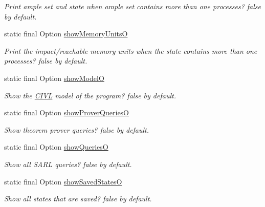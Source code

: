 \begin{DoxyCompactItemize}
\begin{DoxyCompactList}\small\item\em Print ample set and state when ample set contains more than one processes? false by default. \end{DoxyCompactList}\item 
static final Option \hyperlink{classedu_1_1udel_1_1cis_1_1vsl_1_1civl_1_1config_1_1IF_1_1CIVLConstants_a2ee171df807b757e1939921c136ed0de}{show\+Memory\+Units\+O}
\begin{DoxyCompactList}\small\item\em Print the impact/reachable memory units when the state contains more than one processes? false by default. \end{DoxyCompactList}\item 
static final Option \hyperlink{classedu_1_1udel_1_1cis_1_1vsl_1_1civl_1_1config_1_1IF_1_1CIVLConstants_adead4ea0b8731d999ff5cc756eb225f1}{show\+Model\+O}
\begin{DoxyCompactList}\small\item\em Show the \hyperlink{classedu_1_1udel_1_1cis_1_1vsl_1_1civl_1_1CIVL}{C\+I\+V\+L} model of the program? false by default. \end{DoxyCompactList}\item 
static final Option \hyperlink{classedu_1_1udel_1_1cis_1_1vsl_1_1civl_1_1config_1_1IF_1_1CIVLConstants_a41047684c4773025f807772e1e092ec1}{show\+Prover\+Queries\+O}
\begin{DoxyCompactList}\small\item\em Show theorem prover queries? false by default. \end{DoxyCompactList}\item 
static final Option \hyperlink{classedu_1_1udel_1_1cis_1_1vsl_1_1civl_1_1config_1_1IF_1_1CIVLConstants_af4dcfade450026cfe265963cd1c3fcac}{show\+Queries\+O}
\begin{DoxyCompactList}\small\item\em Show all S\+A\+R\+L queries? false by default. \end{DoxyCompactList}\item 
static final Option \hyperlink{classedu_1_1udel_1_1cis_1_1vsl_1_1civl_1_1config_1_1IF_1_1CIVLConstants_aa0f2c2af31ae647bc2dc6398a47031cb}{show\+Saved\+States\+O}
\begin{DoxyCompactList}\small\item\em Show all states that are saved? false by default. \end{DoxyCompactList}\item 

\end{DoxyCompactItemize}
